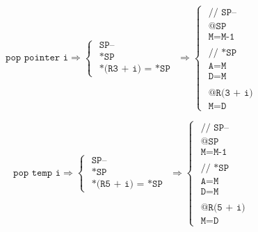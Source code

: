\documentclass[a4paper]{book}
\begin{document}
\[
    \texttt{pop pointer i}
    \Rightarrow
    \begin{cases}
        \texttt{ SP--            } \\
        \texttt{ *SP             } \\
        \texttt{ *(R3 + i) = *SP }
    \end{cases}
    \Rightarrow
    \begin{cases}
        \texttt{ // SP--   } \\
        \texttt{ @SP       } \\
        \texttt{ M=M-1     } \\
        \\
        \texttt{ // *SP    } \\
        \texttt{ A=M       } \\
        \texttt{ D=M       } \\
        \\
        \texttt{ @R(3 + i) } \\
        \texttt{ M=D       }
    \end{cases}
\]

\[
    \texttt{pop temp i}
    \Rightarrow
    \begin{cases}
        \texttt{ SP--            } \\
        \texttt{ *SP             } \\
        \texttt{ *(R5 + i) = *SP }
    \end{cases}
    \Rightarrow
    \begin{cases}
        \texttt{ // SP--   } \\
        \texttt{ @SP       } \\
        \texttt{ M=M-1     } \\
        \\
        \texttt{ // *SP    } \\
        \texttt{ A=M       } \\
        \texttt{ D=M       } \\
        \\
        \texttt{ @R(5 + i) } \\
        \texttt{ M=D       }
    \end{cases}
\]
\end{document}
